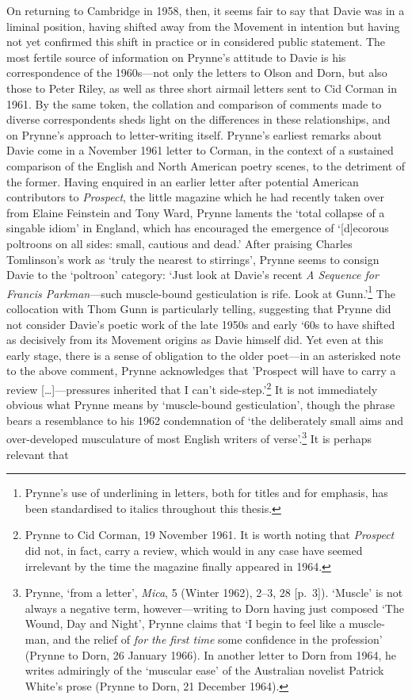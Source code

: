 \documentclass[]{article}
\begin{document}
On returning to Cambridge in 1958, then, it seems fair to say that Davie
was in a liminal position, having shifted away from the Movement in
intention but having not yet confirmed this shift in practice or in
considered public statement. The most fertile source of information on
Prynne’s attitude to Davie is his correspondence of the 1960s—not only
the letters to Olson and Dorn, but also those to Peter Riley, as well as
three short airmail letters sent to Cid Corman in 1961. By the same
token, the collation and comparison of comments made to diverse
correspondents sheds light on the differences in these relationships,
and on Prynne’s approach to letter-writing itself. Prynne’s earliest
remarks about Davie come in a November 1961 letter to Corman, in the
context of a sustained comparison of the English and North American
poetry scenes, to the detriment of the former. Having enquired in an
earlier letter after potential American contributors to \emph{Prospect},
the little magazine which he had recently taken over from Elaine
Feinstein and Tony Ward, Prynne laments the ‘total collapse of a
singable idiom’ in England, which has encouraged the emergence of
‘{[}d{]}ecorous poltroons on all sides: small, cautious and dead.’ After
praising Charles Tomlinson’s work as ‘truly the nearest to stirrings’,
Prynne seems to consign Davie to the ‘poltroon’ category: ‘Just look at
Davie’s recent \emph{A Sequence for Francis Parkman}—such muscle-bound
gesticulation is rife. Look at Gunn.’\footnote{Prynne’s use of
  underlining in letters, both for titles and for emphasis, has been
  standardised to italics throughout this thesis.} The collocation with
Thom Gunn is particularly telling, suggesting that Prynne did not
consider Davie’s poetic work of the late 1950s and early ‘60s to have
shifted as decisively from its Movement origins as Davie himself did.
Yet even at this early stage, there is a sense of obligation to the
older poet—in an asterisked note to the above comment, Prynne
acknowledges that ’Prospect will have to carry a review
{[}\ldots{}{]}—pressures inherited that I can’t side-step.’\footnote{Prynne
  to Cid Corman, 19 November 1961. It is worth noting that
  \emph{Prospect} did not, in fact, carry a review, which would in any
  case have seemed irrelevant by the time the magazine finally appeared
  in 1964.} It is not immediately obvious what Prynne means by
‘muscle-bound gesticulation’, though the phrase bears a resemblance to
his 1962 condemnation of ‘the deliberately small aims and over-developed
musculature of most English writers of verse’.\footnote{Prynne, ‘from a
  letter’, \emph{Mica}, 5 (Winter 1962), 2–3, 28 {[}p.~3{]}). ‘Muscle’
  is not always a negative term, however—writing to Dorn having just
  composed ‘The Wound, Day and Night’, Prynne claims that ‘I begin to
  feel like a muscle-man, and the relief of \emph{for the first time}
  some confidence in the profession’ (Prynne to Dorn, 26 January 1966).
  In another letter to Dorn from 1964, he writes admiringly of the
  ‘muscular ease’ of the Australian novelist Patrick White’s prose
  (Prynne to Dorn, 21 December 1964).} It is perhaps relevant that
\end{document}
